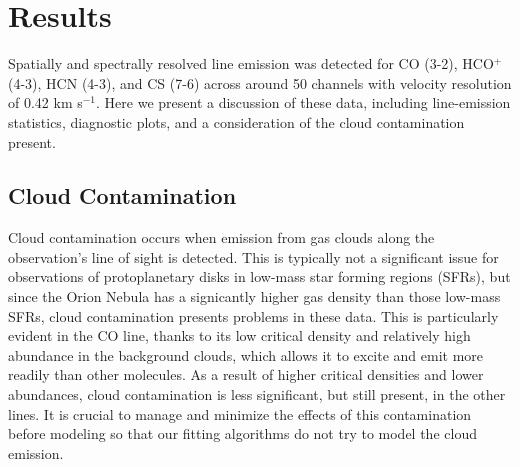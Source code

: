\chapter{Results}
\label{chap:results}


Spatially and spectrally resolved line emission was detected for CO (3-2), HCO$^{+}$ (4-3), HCN (4-3), and CS (7-6) across around 50 channels with velocity resolution of 0.42 km s$^{-1}$. Here we present a discussion of these data, including line-emission statistics, diagnostic plots, and a consideration of the cloud contamination present.


\section{Cloud Contamination}
\label{section:cloud_contamination}

Cloud contamination occurs when emission from gas clouds along the observation's line of sight is detected. This is typically not a significant issue for observations of protoplanetary disks in low-mass star forming regions (SFRs), but since the Orion Nebula has a signicantly higher gas density than those low-mass SFRs, cloud contamination presents problems in these data. This is particularly evident in the CO line, thanks to its low critical density and relatively high abundance in the background clouds, which allows it to excite and emit more readily than other molecules. As a result of higher critical densities and lower abundances, cloud contamination is less significant, but still present, in the other lines. It is crucial to manage and minimize the effects of this contamination before modeling so that our fitting algorithms do not try to model the cloud emission.




